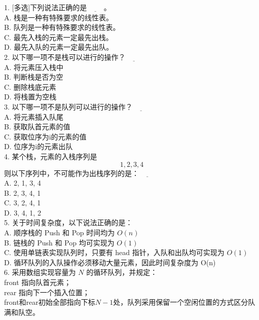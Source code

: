 \clearpage%
\begin{exercise}
    1. [多选]下列说法正确的是$\underline{\hspace{1cm}}$。\\
A. 栈是一种有特殊要求的线性表。\\
B. 队列是一种有特殊要求的线性表。\\
C. 最先入栈的元素一定最先出栈。\\
D. 最先入队的元素一定最先出队。\\

    2. 以下哪一项不是栈可以进行的操作？$\underline{\hspace{1cm}}$\\
A. 将元素压入栈中\\
B. 判断栈是否为空\\
C. 删除栈底元素\\
D. 将栈置为空栈\\

    3. 以下哪一项不是队列可以进行的操作？$\underline{\hspace{1cm}}$\\
A. 将元素插入队尾\\
B. 获取队首元素的值\\
C. 获取位序为i的元素的值\\
D. 位序为i的元素出队\\

    4. 某个栈，元素的入栈序列是 $$ 1,2,3,4 $$ 则以下序列中，不可能作为出栈序列的是：$\underline{\hspace{1cm}}$\\
A. 2, 1, 3, 4\\
B. 2, 3, 4, 1\\
C. 3, 2, 4, 1\\
D. 3, 4, 1, 2\\

    5. 关于时间复杂度，以下说法正确的是：\\
A. 顺序栈的 Push 和 Pop 时间均为 \(O(n)\)\\
B. 链栈的 Push 和 Pop 均可实现为 \(O(1)\)\\
C. 使用单链表实现队列时，只要有 head 指针，入队和出队均可实现为 \(O(1)\)\\
D. 循环队列的入队操作必须移动大量元素，因此时间复杂度为 O(n)\\

    6. 采用数组实现容量为 \(N\) 的循环队列，并规定：\\
front 指向队首元素；\\
rear 指向下一个插入位置；\\
front和rear初始全部指向下标\(N-1\)处，队列采用保留一个空闲位置的方式区分队满和队空。


\end{exercise}
